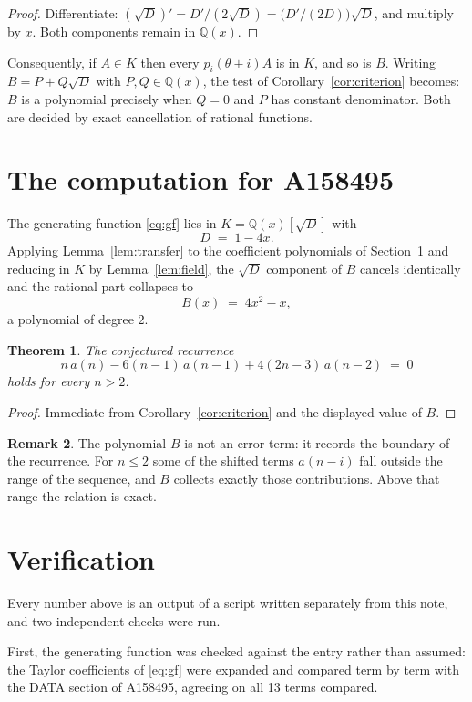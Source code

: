 \documentclass[11pt,a4paper]{article}
\theoremstyle{plain}
\newtheorem{theorem}{Theorem}
\theoremstyle{definition}
\newtheorem{remark}[theorem]{Remark}
\begin{document}
\begin{proof}
Differentiate: $(\sqrt{D})'=D'/(2\sqrt{D})=\bigl(D'/(2D)\bigr)\sqrt{D}$, and multiply by
$x$. Both components remain in $\mathbb{Q}(x)$.
\end{proof}

Consequently, if $A\in K$ then every $p_{i}(\theta+i)A$ is in $K$, and so is $B$. Writing
$B=P+Q\sqrt{D}$ with $P,Q\in\mathbb{Q}(x)$, the test of Corollary~\ref{cor:criterion}
becomes: $B$ is a polynomial precisely when $Q=0$ and $P$ has constant denominator. Both
are decided by exact cancellation of rational functions.

\section{The computation for A158495}

The generating function \eqref{eq:gf} lies in $K=\mathbb{Q}(x)[\sqrt{D}]$ with
\[
D \;=\; 1 - 4 x .
\]
Applying Lemma~\ref{lem:transfer} to the coefficient polynomials of Section~1 and reducing
in $K$ by Lemma~\ref{lem:field}, the $\sqrt{D}$ component of $B$ cancels identically and
the rational part collapses to
\[
B(x)\;=\;4 x^{2} - x ,
\]
a polynomial of degree $2$.

\begin{theorem}
The conjectured recurrence
\[
n\,a(n) -  6 \left(n - 1\right)\,a(n-1) + 4 \left(2 n - 3\right)\,a(n-2) \;=\;0
\]
holds for every $n>2$.
\end{theorem}

\begin{proof}
Immediate from Corollary~\ref{cor:criterion} and the displayed value of $B$.
\end{proof}

\begin{remark}
The polynomial $B$ is not an error term: it records the boundary of the recurrence. For
$n\le2$ some of the shifted terms $a(n-i)$ fall outside the range of the sequence,
and $B$ collects exactly those contributions. Above that range the relation is exact.
\end{remark}

\section{Verification}

Every number above is an output of a script written separately from this note, and two
independent checks were run.

First, the generating function was checked against the entry rather than assumed: the
Taylor coefficients of \eqref{eq:gf} were expanded and compared term by term with the DATA
section of A158495, agreeing on all 13 terms compared.
\end{document}
